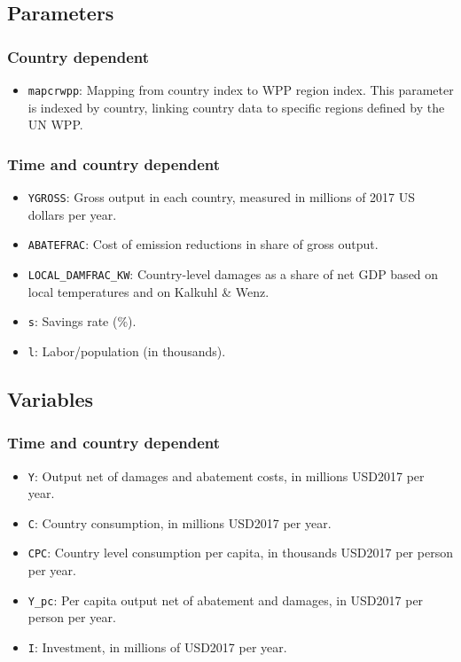 \documentclass[
]{article}
\providecommand{\tightlist}{%
  \setlength{\itemsep}{0pt}\setlength{\parskip}{0pt}}
\begin{document}
\subsection{Parameters}\label{parameters-4}

\subsubsection{Country dependent}\label{country-dependent-2}

\begin{itemize}
\tightlist
\item
  \texttt{mapcrwpp}: Mapping from country index to WPP region index.
  This parameter is indexed by country, linking country data to specific
  regions defined by the UN WPP.
\end{itemize}

\subsubsection{Time and country
dependent}\label{time-and-country-dependent-8}

\begin{itemize}
\item
  \texttt{YGROSS}: Gross output in each country, measured in millions of
  2017 US dollars per year.
\item
  \texttt{ABATEFRAC}: Cost of emission reductions in share of gross
  output.
\item
  \texttt{LOCAL\_DAMFRAC\_KW}: Country-level damages as a share of net
  GDP based on local temperatures and on Kalkuhl \& Wenz.
\item
  \texttt{s}: Savings rate (\%).
\item
  \texttt{l}: Labor/population (in thousands).
\end{itemize}

\subsection{Variables}\label{variables-4}

\subsubsection{Time and country
dependent}\label{time-and-country-dependent-9}

\begin{itemize}
\item
  \texttt{Y}: Output net of damages and abatement costs, in millions
  USD2017 per year.
\item
  \texttt{C}: Country consumption, in millions USD2017 per year.
\item
  \texttt{CPC}: Country level consumption per capita, in thousands USD2017 per person per year.
\item
  \texttt{Y\_pc}: Per capita output net of abatement and damages, in
  USD2017 per person per year.
\item
  \texttt{I}: Investment, in millions of
   USD2017 per year.
\end{itemize}
\end{document}
